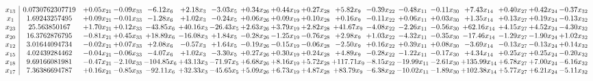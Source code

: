 \documentclass[9pt]{article}
\begin{document}
 \[\begin{array}{c| c c@{\hskip 2pt} c@{\hskip 2pt} c@{\hskip 2pt} c@{\hskip 2pt} c@{\hskip 2pt} c@{\hskip 2pt} c@{\hskip 2pt} c@{\hskip 2pt} c@{\hskip 2pt} c@{\hskip 2pt} c@{\hskip 2pt} c@{\hskip 2pt} c@{\hskip 2pt} c@{\hskip 2pt} c@{\hskip 2pt} c@{\hskip 2pt} }
 x_{13}   &  0.0730762307719 & +  0.05 x_{21} & -0.09 x_{33} & -6.12 x_{6} & +  2.18 x_{3} & -3.03 x_{5} & +  0.34 x_{26} & +  0.44 x_{19} & +  0.27 x_{28} & +  5.82 x_{9} & -0.39 x_{22} & -0.48 x_{11} & -0.11 x_{30} & +  7.43 x_{14} & +  0.40 x_{27} & +  0.42 x_{24} & -0.37 x_{32}\\
 x_{1}   &  1.69243257495 & +  0.09 x_{21} & -0.01 x_{33} & -1.28 x_{6} & +  1.02 x_{3} & -0.24 x_{5} & +  0.06 x_{26} & +  0.09 x_{19} & +  0.10 x_{28} & +  0.16 x_{9} & -0.11 x_{22} & +  0.06 x_{11} & +  0.03 x_{30} & +  1.35 x_{14} & +  0.13 x_{27} & +  0.19 x_{24} & -0.13 x_{32}\\
 x_{23}   &  25.563850167 & +  1.70 x_{21} & +  0.12 x_{33} & -43.85 x_{6} & + 40.16 x_{3} & -26.43 x_{5} & +  2.63 x_{26} & +  3.79 x_{19} & +  2.82 x_{28} & + 41.67 x_{9} & -4.08 x_{22} & -2.26 x_{11} & -0.56 x_{30} & + 62.16 x_{14} & +  4.15 x_{27} & +  4.52 x_{24} & -4.30 x_{32}\\
 x_{20}   &  16.3762876795 & -0.81 x_{21} & +  0.45 x_{33} & + 18.89 x_{6} & -16.08 x_{3} & +  1.84 x_{5} & -0.28 x_{26} & -1.25 x_{19} & -0.76 x_{28} & +  2.98 x_{9} & +  1.03 x_{22} & -4.32 x_{11} & -0.35 x_{30} & -17.46 x_{14} & -1.29 x_{27} & -1.90 x_{24} & +  1.02 x_{32}\\
 x_{12}   &  3.01644094734 & -0.02 x_{21} & +  0.07 x_{33} & +  2.08 x_{6} & -0.57 x_{3} & +  1.64 x_{5} & -0.19 x_{26} & -0.15 x_{19} & -0.06 x_{28} & -2.50 x_{9} & +  0.16 x_{22} & +  0.39 x_{11} & +  0.08 x_{30} & -3.69 x_{14} & -0.13 x_{27} & -0.13 x_{24} & +  0.14 x_{32}\\
 x_{15}   &  4.02439284462 & -0.04 x_{21} & -0.06 x_{33} & -4.07 x_{6} & +  1.02 x_{3} & -3.30 x_{5} & +  0.27 x_{26} & +  0.30 x_{19} & +  0.24 x_{28} & +  4.89 x_{9} & -0.28 x_{22} & -1.22 x_{11} & -0.17 x_{30} & +  4.34 x_{14} & +  0.25 x_{27} & +  0.25 x_{24} & -0.20 x_{32}\\
 x_{18}   &  9.69166081981 & -0.47 x_{21} & -2.10 x_{33} & -104.85 x_{6} & + 43.13 x_{3} & -71.97 x_{5} & +  6.68 x_{26} & +  8.16 x_{19} & +  5.72 x_{28} & + 117.71 x_{9} & -8.15 x_{22} & -19.99 x_{11} & -2.61 x_{30} & + 135.99 x_{14} & +  6.78 x_{27} & +  7.00 x_{24} & -6.16 x_{32}\\
 x_{17}   &  7.36386694787 & +  0.16 x_{21} & -0.85 x_{33} & -92.11 x_{6} & + 32.33 x_{3} & -45.65 x_{5} & +  5.09 x_{26} & +  6.73 x_{19} & +  4.87 x_{28} & + 83.79 x_{9} & -6.38 x_{22} & -10.02 x_{11} & -1.89 x_{30} & + 102.38 x_{14} & +  5.77 x_{27} & +  6.21 x_{24} & -5.11 x_{32}\\

\end{array}\]
\end{document}
